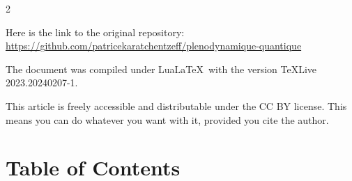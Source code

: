 \begin{multicols}{2}
	\medskip
	
	Here is the link to the original repository:
	\url{https://github.com/patricekaratchentzeff/plenodynamique-quantique}
	\medskip
	
	The document was compiled under Lua\LaTeX\ with the version \TeX Live 2023.20240207-1.
	
	This article is freely accessible and distributable under the CC BY license. This means you can do whatever you want with it, provided you cite the author.
	
	\section{Table of Contents}
	\tableofcontents
	\listoffigures
	\listoftables
\end{multicols}